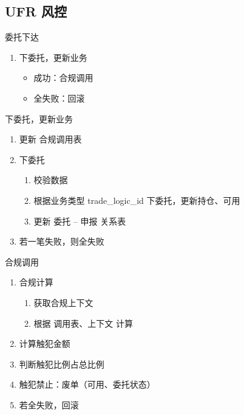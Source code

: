 \documentclass[12pt]{ctexbeamer}	%
\begin{document}

\subsection{UFR 风控}

\begin{frame}{委托下达}
  \begin{enumerate}
    \item 下委托，更新业务
    \begin{itemize}
      \item 成功：合规调用
      \item 全失败：回滚
    \end{itemize}
  \end{enumerate}
\end{frame}

\begin{frame}{下委托，更新业务}
  \begin{enumerate}
    \item 更新 合规调用表
    \item 下委托
    \begin{enumerate}
      \item 校验数据
      \item 根据业务类型 trade\_logic\_id 下委托，更新持仓、可用
      \item 更新 委托 -- 申报 关系表
    \end{enumerate}
    \item 若一笔失败，则全失败
  \end{enumerate}
\end{frame}

\begin{frame}{合规调用}
  \begin{enumerate}
    \item 合规计算
    \begin{enumerate}
      \item 获取合规上下文
      \item 根据 调用表、上下文 计算
    \end{enumerate}
    \item 计算触犯金额
    \item 判断触犯比例占总比例
    \item 触犯禁止：废单（可用、委托状态）
    \item 若全失败，回滚
    \end{enumerate}
\end{frame}
\end{document}
